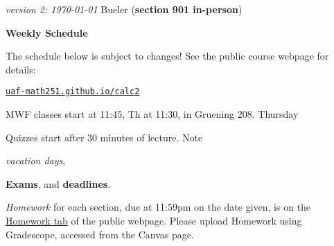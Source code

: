 \documentclass[12pt]{article}
\newcommand{\vacinline}[1]{{\color{OliveGreen} \textsl{#1}}}
\newcommand{\vac}[1]{\strut {\small {\vacinline{#1}}}}
\newcommand{\due}[1]{\strut {\color{BrickRed} \textsl{#1}}}
\newcommand{\dl}[1]{{\small \color{Purple} \textbf{#1}}}
\newcommand{\ee}[1]{\strut {\color{Blue} \textbf{#1}}}
\newcommand{\qq}[1]{\strut {\color{RedOrange} #1}}
\begin{document}
\noindent\footnotesize \emph{version 2: \today} \normalsize \hfill Bueler (\textbf{section 901 in-person})

\bigskip
\centerline{\Large \textbf{Weekly Schedule}}

\bigskip
The schedule below is subject to changes!  See the public course webpage for details:

\medskip

\centerline{\href{https://uaf-math251.github.io/calc2/}{\texttt{uaf-math251.github.io/calc2}}}

\noindent MWF classes start at 11:45, Th at 11:30, in Gruening 208.  Thursday \qq{Quizzes} start after 30 minutes of lecture.  Note \vac{vacation days}, \ee{Exams}, and \dl{deadlines}.  \due{Homework} for each section, due at 11:59pm on the date given, is on the \href{https://uaf-math251.github.io/calc2/}{Homework tab} of the public webpage.  Please upload Homework using Gradescope, accessed from the Canvas page.

\bigskip
\end{document}

